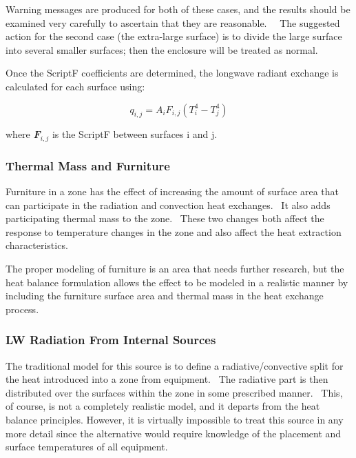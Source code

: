 Warning messages are produced for both of these cases, and the results should be examined very carefully to ascertain that they are reasonable.~~ The suggested action for the second case (the extra-large surface) is to divide the large surface into several smaller surfaces; then the enclosure will be treated as normal.

Once the ScriptF coefficients are determined, the longwave radiant exchange is calculated for each surface using:

\begin{equation}
{q_{i,j}} = {A_i}{F_{i,j}}\left( {T_i^4 - T_j^4} \right)
\end{equation}

where \textbf{\emph{F}}\(_{i,j}\) is the ScriptF between surfaces i and j.

\subsubsection{Thermal Mass and Furniture}\label{thermal-mass-and-furniture}

Furniture in a zone has the effect of increasing the amount of surface area that can participate in the radiation and convection heat exchanges.~ It also adds participating thermal mass to the zone.~ These two changes both affect the response to temperature changes in the zone and also affect the heat extraction characteristics.

The proper modeling of furniture is an area that needs further research, but the heat balance formulation allows the effect to be modeled in a realistic manner by including the furniture surface area and thermal mass in the heat exchange process.

\subsubsection{LW Radiation From Internal Sources}\label{lw-radiation-from-internal-sources}

The traditional model for this source is to define a radiative/convective split for the heat introduced into a zone from equipment.~ The radiative part is then distributed over the surfaces within the zone in some prescribed manner.~ This, of course, is not a completely realistic model, and it departs from the heat balance principles. However, it is virtually impossible to treat this source in any more detail since the alternative would require knowledge of the placement and surface temperatures of all equipment.

